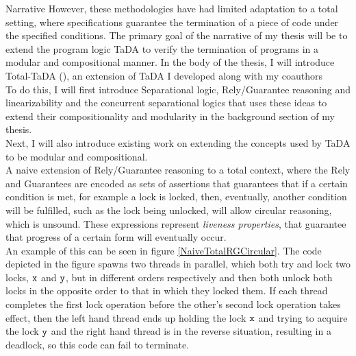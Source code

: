 \documentclass{article}
\begin{document}
\begin{section}{Narrative}
  However, these methodologies have had limited adaptation to a total setting, where specifications guarantee the termination of a piece of code under the specified conditions. The primary goal of the narrative of my thesis will be to extend the program logic TaDA to verify the termination of programs in a modular and compositional manner. In the body of the thesis, I will introduce Total-TaDA (\cite{Total-TaDA}), an extension of TaDA I developed along with my coauthors \\

  To do this, I will first introduce Separational logic, Rely/Guarantee reasoning and linearizability and the concurrent separational logics that uses these ideas to extend their compositionality and modularity in the background section of my thesis. \\

  Next, I will also introduce existing work on extending the concepts used by TaDA to be modular and compositional. \\

  A naive extension of Rely/Guarantee reasoning to a total context, where the Rely and Guarantees are encoded as sets of assertions that guarantees that if a certain condition is met, for example a lock is locked, then, eventually, another condition will be fulfilled, such as the lock being unlocked, will allow circular reasoning, which is unsound\textsuperscript{\cite{McMillan}}. These expressions represent \emph{liveness properties}, that guarantee that progress of a certain form will eventually occur. \\

  An example of this can be seen in figure \ref{NaiveTotalRGCircular}. The code depicted in the figure spawns two threads in parallel, which both try and lock two locks, $\mathtt{x}$ and $\mathtt{y}$, but in different orders respectively and then both unlock both locks in the opposite order to that in which they locked them. If each thread completes the first lock operation before the other's second lock operation takes effect, then the left hand thread ends up holding the lock $\mathtt{x}$ and trying to acquire the lock $\mathtt{y}$ and the right hand thread is in the reverse situation, resulting in a deadlock, so this code can fail to terminate.\\


\end{section}
\end{document}
